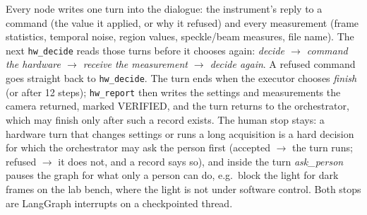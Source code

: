 \documentclass[11pt,a4paper]{article}
\begin{document}
Every node writes one turn into the dialogue: the instrument's reply to a command (the value it applied, or why it refused)
and every measurement (frame statistics, temporal noise, region values, speckle/beam measures, file name). The next
\texttt{hw\_decide} reads those turns before it chooses again: \emph{decide $\to$ command the hardware $\to$ receive the
measurement $\to$ decide again}. A refused command goes straight back to \texttt{hw\_decide}. The turn ends when the
executor chooses \emph{finish} (or after 12 steps); \texttt{hw\_report} then writes the settings and measurements the
camera returned, marked VERIFIED, and the turn returns to the orchestrator, which may finish only after such a record exists.
The human stop stays: a hardware turn that changes settings or runs a long acquisition is a hard decision for which the
orchestrator may ask the person first (accepted $\to$ the turn runs; refused $\to$ it does not, and a record says so), and
inside the turn \emph{ask\_person} pauses the graph for what only a person can do, e.g.\ block the light for dark frames on
the lab bench, where the light is not under software control. Both stops are LangGraph interrupts on a checkpointed thread.

\end{document}
